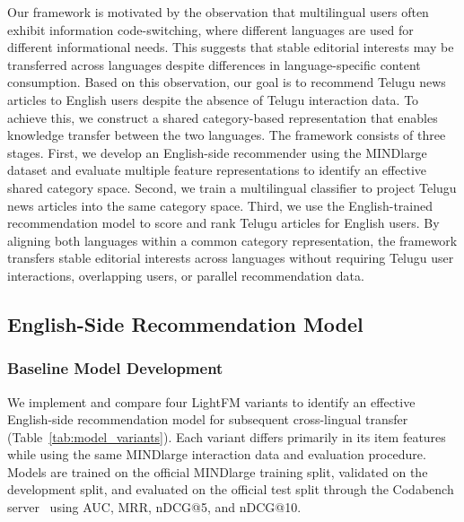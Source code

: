 \documentclass[conference]{IEEEtran}
\begin{document}
Our framework is motivated by the observation that multilingual users often exhibit information code-switching, where different languages are used for different informational needs. This suggests that stable editorial interests may be transferred across languages despite differences in language-specific content consumption. Based on this observation, our goal is to recommend Telugu news articles to English users despite the absence of Telugu interaction data. To achieve this, we construct a shared category-based representation that enables knowledge transfer between the two languages. The framework consists of three stages. First, we develop an English-side recommender using the MINDlarge dataset and evaluate multiple feature representations to identify an effective shared category space. Second, we train a multilingual classifier to project Telugu news articles into the same category space. Third, we use the English-trained recommendation model to score and rank Telugu articles for English users. By aligning both languages within a common category representation, the framework transfers stable editorial interests across languages without requiring Telugu user interactions, overlapping users, or parallel recommendation data.

\subsection{English-Side Recommendation Model}

\subsubsection{Baseline Model Development}

We implement and compare four LightFM variants to identify an effective English-side recommendation model for subsequent cross-lingual transfer (Table~\ref{tab:model_variants}). Each variant differs primarily in its item features while using the same MINDlarge interaction data and evaluation procedure. Models are trained on the official MINDlarge training split, validated on the development split, and evaluated on the official test split through the Codabench server~\cite{codabench} using AUC, MRR, nDCG@5, and nDCG@10.
\end{document}
